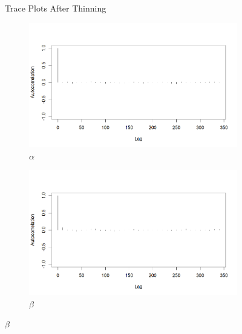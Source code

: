 \documentclass{Class/julia}
\begin{document}
\begin{figure}[!ht]
    \caption{Trace Plots After Thinning}
    \label{fig:7}
\end{figure}

\begin{figure}[!ht]
    \centering
    \begin{subfigure}{0.45\textwidth}
        \centering
        \includegraphics[width=\textwidth]{rytgaard1990/acf_after_thinning_alpha.png}
        \caption{\( \alpha \)}
    \end{subfigure}
    \hfill
    \begin{subfigure}{0.45\textwidth}
        \centering
        \includegraphics[width=\textwidth]{rytgaard1990/acf_after_thinning_beta.png}
        \caption{\( \beta \)}
    \end{subfigure}

    \vspace{1em}


\end{figure}
\end{document}
